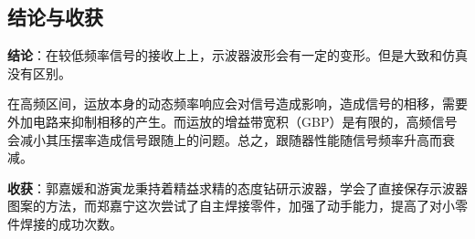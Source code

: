 \documentclass[./测控三级项目.tex]{subfiles} %
\begin{document}
	\subsection{结论与收获}
	\textbf{结论}：在较低频率信号的接收上上，示波器波形会有一定的变形。但是大致和仿真没有区别。\par
	在高频区间，运放本身的动态频率响应会对信号造成影响，造成信号的相移，需要外加电路来抑制相移的产生。而运放的增益带宽积（GBP）是有限的，高频信号会减小其压摆率造成信号跟随上的问题。总之，跟随器性能随信号频率升高而衰减。\par
	\textbf{收获}：郭嘉媛和游寅龙秉持着精益求精的态度钻研示波器，学会了直接保存示波器图案的方法，而郑嘉宁这次尝试了自主焊接零件，加强了动手能力，提高了对小零件焊接的成功次数。
	
\end{document}
